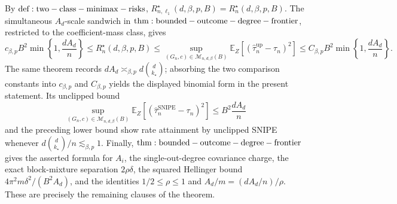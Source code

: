 By \({\rm def:two-class-minimax-risks}\), \(R_{n,\ell_1}^\star(d,\beta,p,B)=R_n^\star(d,\beta,p,B)\). The simultaneous \(A_d\)-scale sandwich in \({\rm thm:bounded-outcome-degree-frontier}\), restricted to the coefficient-mass class, gives
\[
c_{\beta,p}B^2\min\!\left\{1,\frac{dA_d}{n}\right\}
\le R_n^\star(d,\beta,p,B)
\le \sup_{(G_n,c)\in\mathcal M_{n,d,\beta}(B)}
\mathbb E_Z[(\widehat\tau_n^{\mathrm{up}}-\tau_n)^2]
\le C_{\beta,p}B^2\min\!\left\{1,\frac{dA_d}{n}\right\}.
\]
The same theorem records \(dA_d\asymp_{\beta,p}d\binom d{k_\star}\); absorbing the two comparison constants into \(c_{\beta,p}\) and \(C_{\beta,p}\) yields the displayed binomial form in the present statement. Its unclipped bound
\[
\sup_{(G_n,c)\in\mathcal M_{n,d,\beta}(B)}
\mathbb E_Z[(\widehat\tau_n^{\mathrm{SNIPE}}-\tau_n)^2]
\le B^2\frac{dA_d}{n}
\]
and the preceding lower bound show rate attainment by unclipped SNIPE whenever \(d\binom d{k_\star}/n\lesssim_{\beta,p}1\). Finally, \({\rm thm:bounded-outcome-degree-frontier}\) gives the asserted formula for \(A_i\), the single-out-degree covariance charge, the exact block-mixture separation \(2\rho\delta\), the squared Hellinger bound \(4\pi^2m\delta^2/(B^2A_d)\), and the identities \(1/2\le\rho\le1\) and \(A_d/m=(dA_d/n)/\rho\). These are precisely the remaining clauses of the theorem.